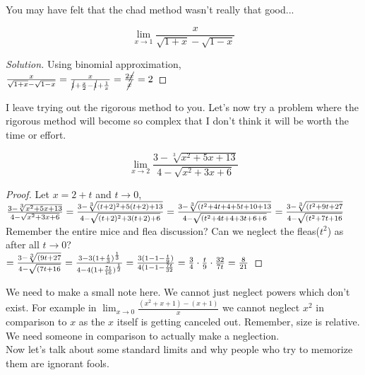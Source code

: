 You may have felt that the chad method wasn't really that good...
\begin{example}
    \[\lim_{x \to 1} \frac{x}{\sqrt{1+x}-\sqrt{1-x}}\]
\end{example}
\begin{proof}
    [Solution]
    Using binomial approximation, \\
    $\frac{x}{\sqrt{1+x}-\sqrt{1-x}}
    = \frac{x}{\cancel{1}+\frac{x}{2}-\cancel{1}+\frac{1}{x}}\\
    =\frac{2\cancel{x}}{\cancel{x}}\\
    =2$
\end{proof}
I leave trying out the rigorous method to you. Let's now try a problem where the rigorous method will become so complex that I don't think it will be worth the time or effort.\\
\begin{example}
    \[\lim_{x \to 2} \frac{3-\sqrt[3]{x^2+5x+13}}{4-\sqrt{x^2+3x+6}}\]
\end{example}
\begin{proof}
    Let $x=2+t$ and $t \to 0$,\\
    $\frac{3-\sqrt[3]{x^2+5x+13}}{4-\sqrt{x^2+3x+6}}\\
    = \frac{3-\sqrt[3]{(t+2)^2+5(t+2)+13}}{4-\sqrt{(t+2)^2+3(t+2)+6}}\\
    = \frac{3-\sqrt[3]{(t^2+4t+4+5t+10+13}}{4-\sqrt{(t^2+4t+4+3t+6+6}}\\
    = \frac{3-\sqrt[3]{(t^2+9t+27}}{4-\sqrt{(t^2+7t+16}}$\\
    Remember the entire mice and flea discussion? Can we neglect the fleas($t^2$) as after all $t \to 0$?\\
    $=\frac{3-\sqrt[3]{(9t+27}}{4-\sqrt{(7t+16}}\\
    = \frac{3-3(1+\frac{t}{3})^{\frac{1}{3}}}{4-4(1+\frac{7t}{16})^{\frac{1}{2}}}\\
    = \frac{3(1-1-\frac{t}{9})}{4(1-1-\frac{7t}{32}}\\
    =\frac{3}{4} \cdot \frac{t}{9} \cdot \frac{32}{7t}\\
    =\frac{8}{21}$
\end{proof}
We need to make a small note here. We cannot just neglect powers which don't exist. For example in $\lim_{x \to 0}\frac{(x^2+x+1)-(x+1)}{x}$ we cannot neglect $x^2$ in comparison to $x$ as the $x$ itself is getting canceled out. Remember, size is relative. We need someone in comparison to actually make a neglection.\\
Now let's talk about some standard limits and why people who try to memorize them are ignorant fools.\\
